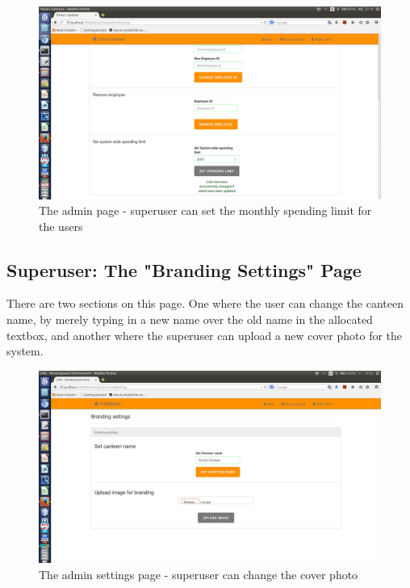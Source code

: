 \documentclass[a4paper,12pt]{report}
\begin{document}
\begin{figure}[H]
  \centering
    \includegraphics[width=1.0\textwidth]{screenshots/setLimit.png}
    \caption{The admin page - superuser can set the monthly spending limit for the users} 
\end{figure}

\subsection{Superuser: The "Branding Settings" Page} 
There are two sections on this page. One where the user can change the canteen name, by merely typing in a new name over the old name in the allocated textbox, and another where the superuser can upload a new cover photo for the system.

\begin{figure}[H]
  \centering
    \includegraphics[width=1.0\textwidth]{screenshots/coverImage.png}
    \caption{The admin settings page - superuser can change the cover photo} 
\end{figure}
\end{document}
